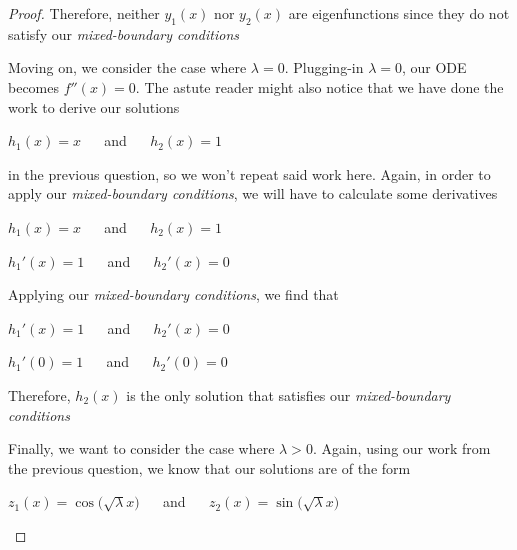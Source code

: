 \documentclass[executivepaper]{article}
\begin{document}
\begin{flushleft}
\begin{proof}
Therefore, neither $y_{1}(x)$ nor $y_{2}(x)$ are eigenfunctions since they do not satisfy our \textit{mixed-boundary conditions}

\vspace{5mm}

Moving on, we consider the case where $\lambda=0$. Plugging-in $\lambda=0$, our ODE becomes $f''(x)=0$. The astute reader might also notice that we have done the work to derive our solutions

\begin{center}

$h_{1}(x)=x$ $\quad$ and $\quad$ $h_{2}(x)=1$

\end{center}

in the previous question, so we won't repeat said work here. Again, in order to apply our \textit{mixed-boundary conditions}, we will have to calculate some derivatives

\begin{center}

$h_{1}(x)=x$ $\quad$ and $\quad$ $h_{2}(x)=1$

\vspace{2mm}

$h_{1}'(x)=1$ $\quad$ and $\quad$ $h_{2}'(x)=0$

\end{center}

Applying our \textit{mixed-boundary conditions}, we find that

\begin{center}

$h_{1}'(x)=1$ $\quad$ and $\quad$ $h_{2}'(x)=0$

\vspace{2mm}

$h_{1}'(0)=1$ $\quad$ and $\quad$ $h_{2}'(0)=0$

\end{center}

Therefore, $h_{2}(x)$ is the only solution that satisfies our \textit{mixed-boundary conditions}

\vspace{5mm}

Finally, we want to consider the case where $\lambda > 0$. Again, using our work from the previous question, we know that our solutions are of the form

\begin{center}

$z_{1}(x)=\cos\bigg(\sqrt{\lambda} x\bigg)$ $\quad$ and $\quad$ $z_{2}(x)=\sin\bigg(\sqrt{\lambda} x\bigg)$


\end{center}
\end{proof}
\end{flushleft}
\end{document}
